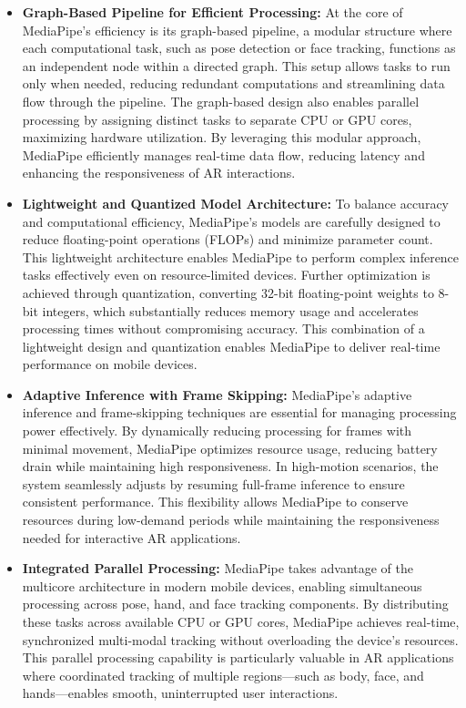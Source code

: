 \begin{itemize}
    \item \textbf{Graph-Based Pipeline for Efficient Processing:} At the core of MediaPipe's efficiency is its graph-based pipeline, a modular structure where each computational task, such as pose detection or face tracking, functions as an independent node within a directed graph.
    This setup allows tasks to run only when needed, reducing redundant computations and streamlining data flow through the pipeline.
    The graph-based design also enables parallel processing by assigning distinct tasks to separate CPU or GPU cores, maximizing hardware utilization.
    By leveraging this modular approach, MediaPipe efficiently manages real-time data flow, reducing latency and enhancing the responsiveness of AR interactions.

    \item \textbf{Lightweight and Quantized Model Architecture:} To balance accuracy and computational efficiency, MediaPipe’s models are carefully designed to reduce floating-point operations (FLOPs) and minimize parameter count.
    This lightweight architecture enables MediaPipe to perform complex inference tasks effectively even on resource-limited devices.
    Further optimization is achieved through quantization, converting 32-bit floating-point weights to 8-bit integers, which substantially reduces memory usage and accelerates processing times without compromising accuracy.
    This combination of a lightweight design and quantization enables MediaPipe to deliver real-time performance on mobile devices.

    \item \textbf{Adaptive Inference with Frame Skipping:} MediaPipe’s adaptive inference and frame-skipping techniques are essential for managing processing power effectively.
    By dynamically reducing processing for frames with minimal movement, MediaPipe optimizes resource usage, reducing battery drain while maintaining high responsiveness.
    In high-motion scenarios, the system seamlessly adjusts by resuming full-frame inference to ensure consistent performance.
    This flexibility allows MediaPipe to conserve resources during low-demand periods while maintaining the responsiveness needed for interactive AR applications.

    \item \textbf{Integrated Parallel Processing:} MediaPipe takes advantage of the multicore architecture in modern mobile devices, enabling simultaneous processing across pose, hand, and face tracking components.
    By distributing these tasks across available CPU or GPU cores, MediaPipe achieves real-time, synchronized multi-modal tracking without overloading the device’s resources.
    This parallel processing capability is particularly valuable in AR applications where coordinated tracking of multiple regions—such as body, face, and hands—enables smooth, uninterrupted user interactions.
\end{itemize}



